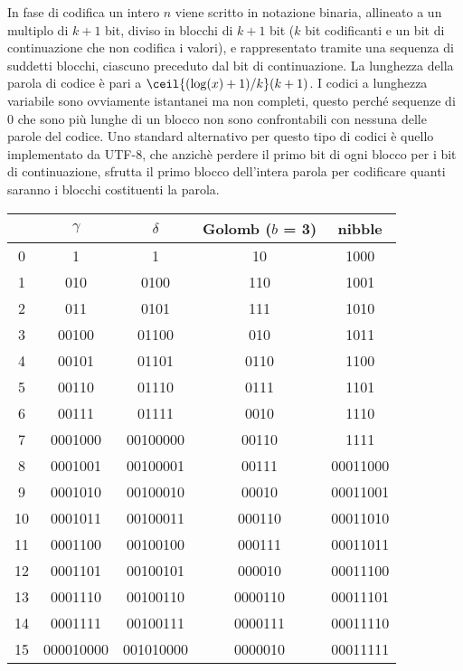 In fase di codifica un intero $n$ viene scritto in notazione binaria, allineato a un multiplo di $k + 1$ bit, diviso in blocchi di $k + 1$ bit ($k$ bit codificanti e un bit di continuazione che non codifica i valori), e rappresentato tramite una sequenza di suddetti blocchi, ciascuno preceduto dal bit di continuazione. La lunghezza della parola di codice è pari a $\ceil{(\log(x) + 1) / k}(k + 1)$. I codici a lunghezza variabile sono ovviamente istantanei ma non completi, questo perché sequenze di 0 che sono più lunghe di un blocco non sono confrontabili con nessuna delle parole del codice. Uno standard alternativo per questo tipo di codici è quello implementato da UTF-8, che anzichè perdere il primo bit di ogni blocco per i bit di continuazione, sfrutta il primo blocco dell'intera parola per codificare quanti saranno i blocchi costituenti la parola.
\begin{table}[ht]
    \centering
    \begin{tabular}{|c||c|c|c|c|}
      \hline
      &$\gamma$ &$\delta$ &Golomb ($b$ = 3) &nibble \\
      \hline
      0 &1 &1 &10 &1000 \\
      1 &010 &0100 &110 &1001 \\
      2 &011 &0101 &111 &1010 \\
      3 &00100 &01100 &010 &1011 \\
      4 &00101 &01101 &0110 &1100 \\
      5 &00110 &01110 &0111 &1101 \\
      6 &00111 &01111 &0010 &1110 \\
      7 &0001000 &00100000 & 00110 &1111 \\
      8 &0001001 &00100001 &00111 &00011000 \\
      9 &0001010 &00100010 &00010 &00011001 \\
      10 &0001011 &00100011 &000110 &00011010 \\
      11 &0001100 &00100100 &000111 &00011011 \\
      12 &0001101 &00100101 &000010 &00011100 \\
      13 &0001110 &00100110 &0000110 &00011101 \\
      14 &0001111 &00100111 &0000111 &00011110 \\
      15 &000010000 &001010000 &0000010 &00011111 \\
      \hline
    \end{tabular}
\end{table}
